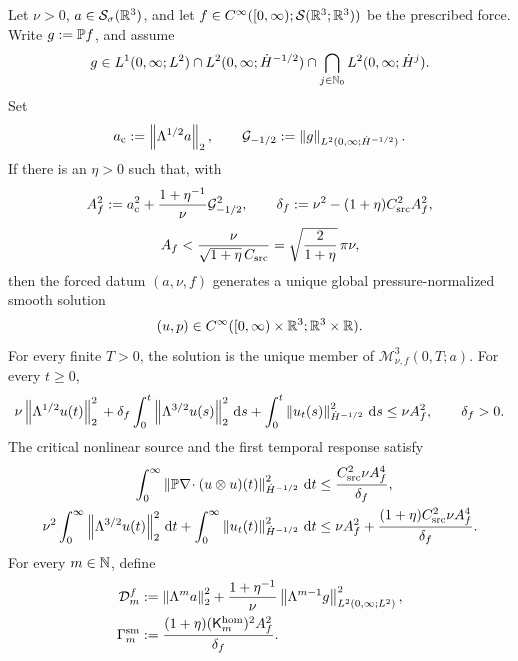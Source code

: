 \begin{theorem}
\label{thm:app-small-critical-global}
Let \(\nu>0\), \(a\in\mathcal S_\sigma(\mathbb R^3)\), and let
\(f\in C^\infty([0,\infty);\mathcal S(\mathbb R^3;\mathbb R^3))\) be the prescribed
force.  Write \(g:=\mathbb P f\), and assume
\begin{equation}
 g\in L^1(0,\infty;L^2)
 \cap L^2(0,\infty;\dot H^{-1/2})
 \cap\bigcap_{j\in\mathbb N_0}L^2(0,\infty;\dot H^j).
 \label{eq:app-small-force-class}
\end{equation}
Set
\[
 a_{\rm c}:=\left\lVert \Lambda^{1/2}a\right\rVert_2,
 \qquad
 \mathcal G_{-1/2}:=\left\lVert g\right\rVert_{L^2(0,\infty;\dot H^{-1/2})}.
\]
If there is an \(\eta>0\) such that, with
\[
 A_f^2:=a_{\rm c}^2
 +\frac{1+\eta^{-1}}{\nu}\mathcal G_{-1/2}^2,
 \qquad
 \delta_f:=\nu^2-(1+\eta)C_{\rm src}^2A_f^2,
\]
\begin{equation}
 A_f<\frac{\nu}{\sqrt{1+\eta}\,C_{\rm src}}
 =\sqrt{\frac{2}{1+\eta}}\,\pi\nu,
 \label{eq:app-critical-smallness}
\end{equation}
then the forced datum \((a,\nu,f)\) generates a unique global
pressure-normalized smooth solution
\[
 (u,p)\in C^\infty([0,\infty)\times\mathbb R^3;\mathbb R^3\times\mathbb R).
\]
For every finite \(T>0\), the solution is the unique member of
\(\mathscr M_{\nu,f}^3(0,T;a)\).
For every \(t\ge0\),
\begin{equation}
 \nu\left\lVert \Lambda^{1/2}u(t)\right\rVert_2^2
 {}+\delta_f\int_0^t\left\lVert \Lambda^{3/2}u(s)\right\rVert_2^2\,\mathrm d s
+\int_0^t\left\lVert u_t(s)\right\rVert_{\dot H^{-1/2}}^2\,\mathrm d s
 \le\nu A_f^2,
 \qquad \delta_f>0.
 \label{eq:app-critical-stock-action}
\end{equation}
The critical nonlinear source and the first temporal response satisfy
\begin{align}
 \int_0^\infty
 \left\lVert \mathbb P\nabla\!\cdot(u\otimes u)(t)\right\rVert_{\dot H^{-1/2}}^2\,\mathrm d t
 &\le \frac{C_{\rm src}^2\nu A_f^4}{\delta_f},
 \label{eq:app-small-critical-nonlinear-bound}\\
 \nu^2\int_0^\infty\left\lVert \Lambda^{3/2}u(t)\right\rVert_2^2\,\mathrm d t
 +\int_0^\infty\left\lVert u_t(t)\right\rVert_{\dot H^{-1/2}}^2\,\mathrm d t
 &\le \nu A_f^2
 +\frac{(1+\eta)C_{\rm src}^2\nu A_f^4}{\delta_f}.
 \label{eq:app-small-first-temporal-response}
\end{align}
For every \(m\in\mathbb N\), define
\begin{align}
 \mathcal D_m^f
 &:=\norm{\Lambda^ma}_2^2
 +\frac{1+\eta^{-1}}{\nu}
 \norm{\Lambda^{m-1}g}_{L^2(0,\infty;L^2)}^2,
 \notag\\
 \Gamma_m^{\rm sm}
 &:=\frac{(1+\eta)(\mathsf K_m^{\rm hom})^2A_f^2}{\delta_f}.
 \label{eq:app-small-higher-force-data}

\end{align}
\end{theorem}
